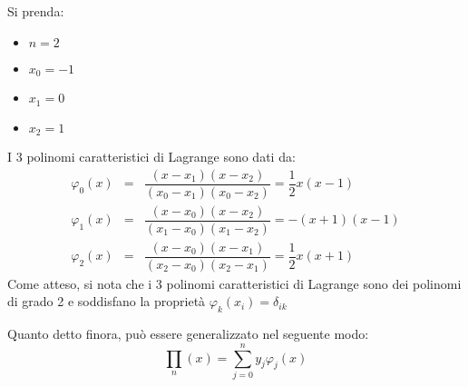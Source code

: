 \begin{examplebox}
	Si prenda:
	\begin{multicols}{2}
		\begin{itemize}
			\item $n = 2$
			\item $x_{0} = -1$
			\item $x_{1} = 0$
			\item $x_{2} = 1$
		\end{itemize}
	\end{multicols}
	I 3 polinomi caratteristici di Lagrange sono dati da:
	\begin{equation*}
		\begin{array}{rcl}
			\varphi_{0}\left(x\right) &=& \dfrac{\left(x-x_{1}\right)\left(x-x_{2}\right)}{\left(x_{0}-x_{1}\right)\left(x_{0}-x_{2}\right)} = \dfrac{1}{2} x\left(x-1\right) \\ [1.5em]
			\varphi_{1}\left(x\right) &=& \dfrac{\left(x-x_{0}\right)\left(x-x_{2}\right)}{\left(x_{1}-x_{0}\right)\left(x_{1}-x_{2}\right)} = -\left(x+1\right)\left(x-1\right) \\ [1.5em]
			\varphi_{2}\left(x\right) &=& \dfrac{\left(x-x_{0}\right)\left(x-x_{1}\right)}{\left(x_{2}-x_{0}\right)\left(x_{2}-x_{1}\right)} = \dfrac{1}{2}x\left(x+1\right)
		\end{array}
	\end{equation*}
	Come atteso, si nota che i 3 polinomi caratteristici di Lagrange sono dei polinomi di grado 2 e soddisfano la proprietà $\varphi_{k}\left(x_{i}\right) = \delta_{ik}$
\end{examplebox}

\highspace
Quanto detto finora, può essere generalizzato nel seguente modo:
\begin{equation}
	\displaystyle\prod_{n}\left(x\right) = \displaystyle\sum_{j=0}^{n} y_{j}\varphi_{j}\left(x\right)
\end{equation}

